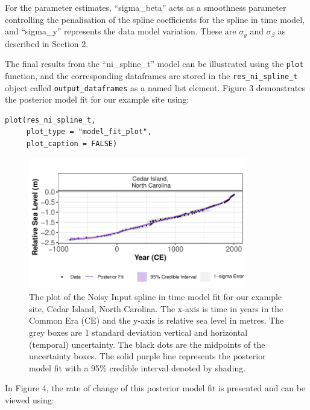 \normalsize

For the parameter estimates, ``sigma\_beta'' acts as a smoothness parameter controlling the penalisation of the spline coefficients for the spline in time model, and ``sigma\_y'' represents the data model variation. These are \(\sigma_y\) and \(\sigma_{\beta}\) as described in Section 2.

The final results from the ``ni\_spline\_t'' model can be illustrated using the \texttt{plot} function, and the corresponding dataframes are stored in the \texttt{res\_ni\_spline\_t} object called \texttt{output\_dataframes} as a named list element. Figure 3 demonstrates the posterior model fit for our example site using:

\scriptsize

\begin{verbatim}
plot(res_ni_spline_t,
     plot_type = "model_fit_plot",
     plot_caption = FALSE)
\end{verbatim}

\begin{figure}

{\centering \includegraphics[width=360px]{RJ-2024-018_files/figure-latex/nisplinemodfit-1} 

}

\caption{The plot of the Noisy Input spline in time model fit for our example site, Cedar Island, North Carolina. The x-axis is time in years in the Common Era (CE) and the y-axis is relative sea level in metres. The grey boxes are 1 standard deviation vertical and horizontal (temporal) uncertainty. The black dots are the midpoints of the uncertainty boxes. The solid purple line represents the posterior model fit with a 95\% credible interval denoted by shading.}\label{fig:nisplinemodfit}
\end{figure}
\normalsize

In Figure 4, the rate of change of this posterior model fit is presented and can be viewed using:

